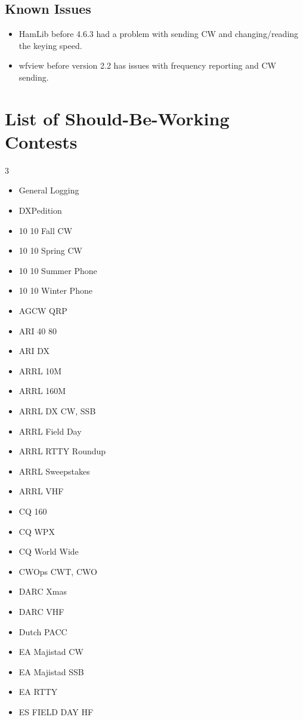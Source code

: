 \documentclass{article}
\begin{document}
\subsection{Known Issues}
\begin{itemize}
    \item {}HamLib before 4.6.3 had a problem with sending CW and changing/reading the keying speed.
    \item wfview before version 2.2 has issues with frequency reporting and CW sending.
\end{itemize}
\newpage
\section{List of Should-Be-Working Contests}
\begin{multicols}{3}
\begin{itemize}
    \item General Logging
    \item DXPedition
    \item 10 10 Fall CW
    \item 10 10 Spring CW
    \item 10 10 Summer Phone
    \item 10 10 Winter Phone
    \item AGCW QRP
    \item ARI 40 80
    \item ARI DX
    \item ARRL 10M
    \item ARRL 160M
    \item ARRL DX CW, SSB
    \item ARRL Field Day
    \item ARRL RTTY Roundup
    \item ARRL Sweepstakes
    \item ARRL VHF
    \item CQ 160
    \item CQ WPX
    \item CQ World Wide
    \item CWOps CWT, CWO
    \item DARC Xmas
    \item DARC VHF
    \item Dutch PACC
    \item EA Majistad CW
    \item EA Majistad SSB
    \item EA RTTY
    \item ES FIELD DAY HF

\end{itemize}
\end{multicols}
\end{document}
